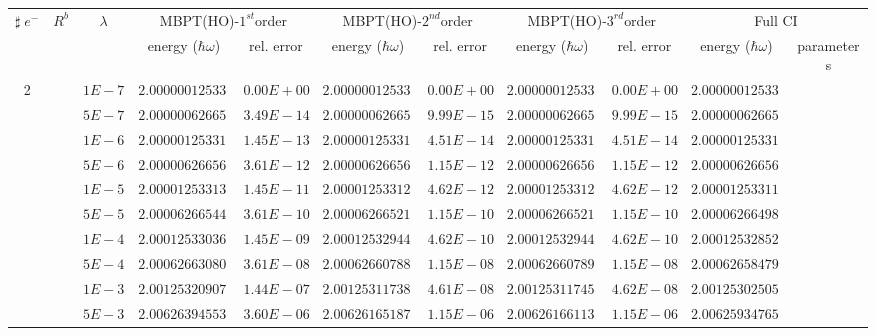 \begin{landscape}
\begin{table}[ht]
\centering      %
{\tiny
\begin{tabular}[c]{c|c|c|c|c|c|c|c|c|c|c} 
\toprule[1pt]
\multicolumn{1}{c|}{$\sharp \; e^{-}$}  & \multicolumn{1}{c|}{$R^b$} & \multicolumn{1}{c|}{$\lambda$} & \multicolumn{2}{c|}{MBPT(HO)-$1^{st}$order}& \multicolumn{2}{c|}{MBPT(HO)-$2^{nd}$order}& \multicolumn{2}{c|}{MBPT(HO)-$3^{rd}$order}& \multicolumn{2}{c}{Full CI}\\
\multicolumn{1}{c|}{}  & \multicolumn{1}{c|}{} & \multicolumn{1}{c|}{} & \multicolumn{1}{c|}{energy ($\hbar \omega$)}& \multicolumn{1}{c|}{rel. error} & \multicolumn{1}{c|}{energy ($\hbar \omega$)}& \multicolumn{1}{c|}{rel. error}& \multicolumn{1}{c|}{energy ($\hbar \omega$)} &\multicolumn{1}{c|}{rel. error}& \multicolumn{1}{c|}{energy ($\hbar \omega$)}& \multicolumn{1}{c}{parameters}\\
\hline
\multirow{56}{*}{2}& &$1E-7$ & $2.000000125331$ & $0.00E+00$ & $2.000000125331$ & $0.00E+00$ & $2.000000125331$ & $0.00E+00$ & $2.000000125331$ & \\
& &$5E-7$ & $2.000000626657$ & $3.49E-14$ & $2.000000626657$ & $9.99E-15$ & $2.000000626657$ & $9.99E-15$ & $2.000000626657$ & \\
& &$1E-6$ & $2.000001253314$ & $1.45E-13$ & $2.000001253314$ & $4.51E-14$ & $2.000001253314$ & $4.51E-14$ & $2.000001253314$ & \\
& &$5E-6$ & $2.000006266568$ & $3.61E-12$ & $2.000006266566$ & $1.15E-12$ & $2.000006266566$ & $1.15E-12$ & $2.000006266563$ & \\
& &$1E-5$ & $2.000012533131$ & $1.45E-11$ & $2.000012533122$ & $4.62E-12$ & $2.000012533122$ & $4.62E-12$ & $2.000012533112$ & \\
& &$5E-5$ & $2.000062665444$ & $3.61E-10$ & $2.000062665215$ & $1.15E-10$ & $2.000062665215$ & $1.15E-10$ & $2.000062664984$ & \\
& &$1E-4$ & $2.000125330363$ & $1.45E-09$ & $2.000125329446$ & $4.62E-10$ & $2.000125329446$ & $4.62E-10$ & $2.000125328523$ & \\
& &$5E-4$ & $2.000626630801$ & $3.61E-08$ & $2.000626607881$ & $1.15E-08$ & $2.000626607890$ & $1.15E-08$ & $2.000626584794$ & \\
& &$1E-3$ & $2.001253209074$ & $1.44E-07$ & $2.001253117385$ & $4.61E-08$ & $2.001253117459$ & $4.62E-08$ & $2.001253025058$ & \\
& &$5E-3$ & $2.006263945539$ & $3.60E-06$ & $2.006261651873$ & $1.15E-06$ & $2.006261661131$ & $1.15E-06$ & $2.006259347655$ & \\

\end{tabular}}
\end{table}
\end{landscape}
